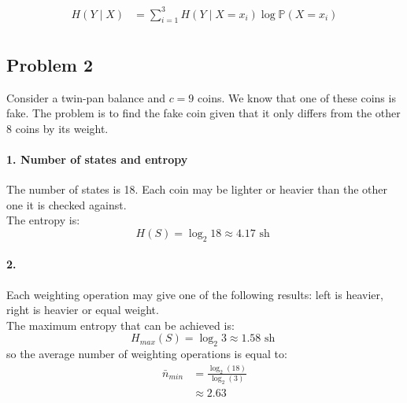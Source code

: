 \documentclass{article}
\newcommand{\1}{\mathbf{1}}
\renewcommand{\P}{\mathbb{P}}
\begin{document}
\begin{align*}
  H(Y \mid X)
   & = \sum_{i=1}^3 H(Y \mid X = x_i) \log \P(X = x_i) \\
\end{align*}

\subsection{Problem 2}
Consider a twin-pan balance and $c = 9$ coins. We know that one of these coins is fake. The problem is to find the fake coin given that it only differs from the other 8 coins by its weight.

\paragraph{1. Number of states and entropy}
The number of states is 18. Each coin may be lighter or heavier than the other one it is checked against. \\
The entropy is:
$$
  H(S) = \log_2 18 \approx 4.17 \text{ sh }
$$

\paragraph{2.}
Each weighting operation may give one of the following results: left is heavier, right is heavier or equal weight. \\
The maximum entropy that can be achieved is:
$$
  H_{max}(S) = \log_2 3 \approx 1.58 \text{ sh }
$$
so the average number of weighting operations is equal to:
\begin{align*}
  \bar{n}_{min}
   & = \frac{\log_2(18)}{\log_2(3)} \\
   & \approx 2.63                   \\
\end{align*}
\end{document}
